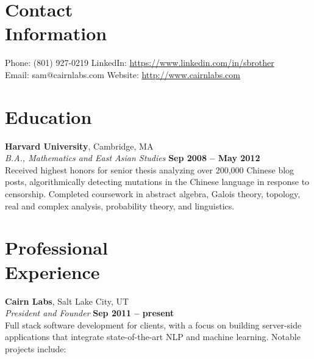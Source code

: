 \documentclass[margin,line]{resume}
\begin{document}
\begin{resume}
    \section{\mysidestyle Contact\\Information}

    Phone: (801) 927-0219       \hfill LinkedIn: \url{https://www.linkedin.com/in/sbrother} \\
    \noindent Email: sam@cairnlabs.com  \hfill Website: \url{http://www.cairnlabs.com} \vspace{0mm}\\\vspace{-4.5mm}

    \section{\mysidestyle Education}

    \textbf{Harvard University}, Cambridge, MA \vspace{2mm}\\\vspace{1mm}%
    \textsl{B.A., Mathematics and East Asian Studies} \hfill \textbf{Sep 2008 -- May 2012}\\
    Received highest honors for senior thesis analyzing over 200,000 Chinese
    blog posts, algorithmically detecting mutations in the Chinese language in
    response to censorship. Completed coursework in abstract algebra,
    Galois theory, topology, real and complex analysis, probability theory, and
    linguistics.

    \section{\mysidestyle Professional\\Experience}

    \textbf{Cairn Labs}, Salt Lake City, UT \vspace{2mm}\\\vspace{1mm}%
    \textsl{President and Founder} \hfill \textbf{Sep 2011 -- present}\\
    Full stack software development for clients, with a focus on building
    server-side applications that integrate state-of-the-art NLP and
    machine learning. Notable projects include:


\end{resume}
\end{document}
